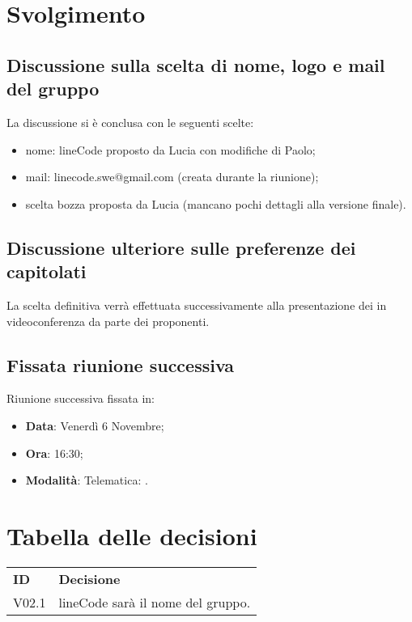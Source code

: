 \documentclass[]{article}
\begin{document}
	\newpage

	\section{Svolgimento}
		\subsection{Discussione sulla scelta di nome, logo e mail del gruppo}
		La discussione si è conclusa con le seguenti scelte:
		\begin{itemize}
				\item nome: lineCode proposto da Lucia con modifiche di Paolo;
				\item mail: linecode.swe@gmail.com (creata durante la riunione);
				\item scelta bozza proposta da Lucia (mancano pochi dettagli
	      	      alla versione finale).\\
			\end{itemize}
	      	      
		\subsection{Discussione ulteriore sulle preferenze dei capitolati}
		La scelta definitiva verrà effettuata successivamente alla
	    presentazione dei  in videoconferenza da parte dei proponenti.\\

		\subsection{Fissata riunione successiva}
		Riunione successiva fissata in:
		\begin{itemize}
			\item \textbf{Data}: Venerdì 6 Novembre;
			\item \textbf{Ora}: 16:30;
			\item \textbf{Modalità}: Telematica: .
		\end{itemize}
	
	\newpage
	
	\section{Tabella delle decisioni}
	
	\begin{table} [h!]
		\begin{center}
			\begin{tabular} { m{2cm} m{14cm} }
				\rowcolor{lightgray}
				\textbf{ID} & \textbf{Decisione}\\
				V02.1 & lineCode sarà il nome del gruppo.\\
			\end{tabular}
		\end{center}
	\end{table}
\end{document}
